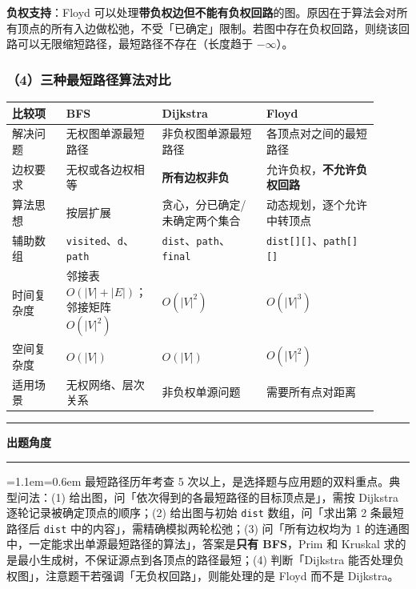 \documentclass[11pt,openany,UTF8]{ctexbook}
\newcommand{\callouthead}[2]{%
  \par\addvspace{7pt}\noindent
  {\color{#1}\rule[-0.15em]{3pt}{1.05em}}\hspace{0.5em}%
  {\bfseries\color{#1}#2}\par\nobreak\vspace{-0.35em}%
  {\color{rulesep}\hrule height 0.4pt}\nobreak\vspace{0.45em}%
  \begingroup\small\setlength{\parindent}{0pt}%
  \leftskip=1.1em\rightskip=0.6em\noindent\ignorespaces}
\newcommand{\calloutend}{\par\endgroup\addvspace{7pt}}
\newenvironment{callexam}[1]{\callouthead{exambar}{#1}}{\calloutend}
\begin{document}
\textbf{负权支持}：Floyd 可以处理\textbf{带负权边但不能有负权回路}的图。原因在于算法会对所有顶点的所有入边做松弛，不受「已确定」限制。若图中存在负权回路，则绕该回路可以无限缩短路径，最短路径不存在（长度趋于 $-\infty$）。

\subsubsection{（4）三种最短路径算法对比}

\begingroup\small\setlength{\tabcolsep}{4.0pt}
\begin{longtable}{@{}L{0.1386\linewidth}L{0.2394\linewidth}L{0.2562\linewidth}L{0.2772\linewidth}@{}}
\toprule
\textbf{比较项} & \textbf{BFS} & \textbf{Dijkstra} & \textbf{Floyd} \\
\midrule
\endhead
解决问题 & 无权图单源最短路径 & 非负权图单源最短路径 & 各顶点对之间的最短路径 \\
边权要求 & 无权或各边权相等 & \textbf{所有边权非负} & 允许负权，\textbf{不允许负权回路} \\
算法思想 & 按层扩展 & 贪心，分已确定/未确定两个集合 & 动态规划，逐个允许中转顶点 \\
辅助数组 & \texttt{visited}、\texttt{d}、\texttt{path} & \texttt{dist}、\texttt{path}、\texttt{final} & \texttt{dist[]\allowbreak{}[]\allowbreak{}}、\texttt{path[]\allowbreak{}[]\allowbreak{}} \\
时间复杂度 & 邻接表 $O(\lvert V\rvert+\lvert E\rvert)$；邻接矩阵 $O(\lvert V\rvert^{2})$ & $O(\lvert V\rvert^{2})$ & $O(\lvert V\rvert^{3})$ \\
空间复杂度 & $O(\lvert V\rvert)$ & $O(\lvert V\rvert)$ & $O(\lvert V\rvert^{2})$ \\
适用场景 & 无权网络、层次关系 & 非负权单源问题 & 需要所有点对距离 \\
\bottomrule
\end{longtable}
\endgroup

\begin{callexam}{出题角度}
最短路径历年考查 5 次以上，是选择题与应用题的双料重点。典型问法：(1) 给出图，问「依次得到的各最短路径的目标顶点是」，需按 Dijkstra 逐轮记录被确定顶点的顺序；(2) 给出图与初始 \texttt{dist} 数组，问「求出第 2 条最短路径后 \texttt{dist} 中的内容」，需精确模拟两轮松弛；(3) 问「所有边权均为 1 的连通图中，一定能求出单源最短路径的算法」，答案是\textbf{只有 BFS}，Prim 和 Kruskal 求的是最小生成树，不保证源点到各顶点的路径最短；(4) 判断「Dijkstra 能否处理负权图」，注意题干若强调「无负权回路」，则能处理的是 Floyd 而不是 Dijkstra。

\end{callexam}
\end{document}
